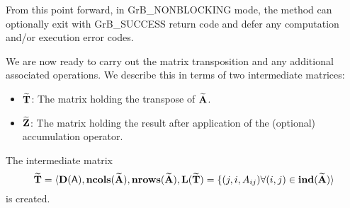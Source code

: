 From this point forward, in {\sf GrB\_NONBLOCKING} mode, the method can 
optionally exit with {\sf GrB\_SUCCESS} return code and defer any computation 
and/or execution error codes.

We are now ready to carry out the matrix transposition and any additional 
associated operations.  We describe this in terms of two intermediate matrices:
\begin{itemize}
    \item ${\bf \widetilde{T}}$: The matrix holding the  transpose of
    ${\bf \widetilde{A}}$.
    \item ${\bf \widetilde{Z}}$: The matrix holding the result after 
    application of the (optional) accumulation operator.
\end{itemize}

The intermediate matrix
\[
{\bf \widetilde{T}} = \langle
\bold{D}({\bf \sf A}), \bold{ncols}({\bf \widetilde{A}}),
\bold{nrows}({\bf \widetilde{A}}), \bold{L}({\bf \widetilde{T}}) =
\{(j,i,A_{ij}) \forall (i,j) \in \bold{ind}({\bf \widetilde{A}}) 
\rangle
\]
is created.  




